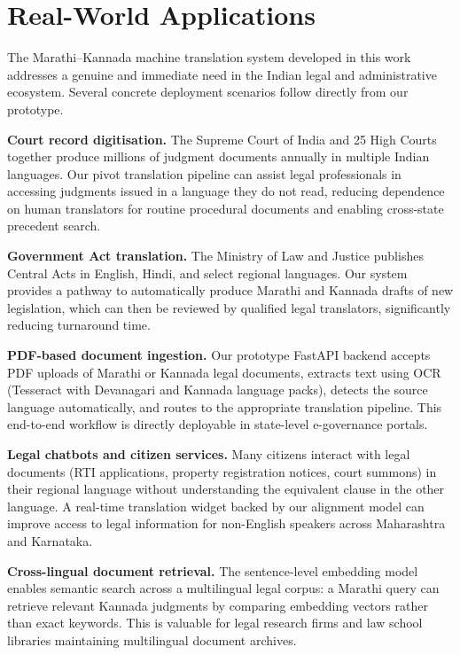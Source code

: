 \documentclass[conference,letterpaper]{IEEEtran}
\begin{document}
\vspace{0.5cm}

\section{Real-World Applications}

The Marathi--Kannada machine translation system developed in this work
addresses a genuine and immediate need in the Indian legal and
administrative ecosystem. Several concrete deployment scenarios follow
directly from our prototype.

\textbf{Court record digitisation.} The Supreme Court of India and 25 High
Courts together produce millions of judgment documents annually in multiple
Indian languages. Our pivot translation pipeline can assist legal
professionals in accessing judgments issued in a language they do not read,
reducing dependence on human translators for routine procedural documents
and enabling cross-state precedent search.

\textbf{Government Act translation.} The Ministry of Law and Justice
publishes Central Acts in English, Hindi, and select regional languages.
Our system provides a pathway to automatically produce Marathi and Kannada
drafts of new legislation, which can then be reviewed by qualified legal
translators, significantly reducing turnaround time.

\textbf{PDF-based document ingestion.} Our prototype FastAPI backend
accepts PDF uploads of Marathi or Kannada legal documents, extracts text
using OCR (Tesseract with Devanagari and Kannada language packs), detects
the source language automatically, and routes to the appropriate translation
pipeline. This end-to-end workflow is directly deployable in state-level
e-governance portals.

\textbf{Legal chatbots and citizen services.} Many citizens interact with
legal documents (RTI applications, property registration notices, court
summons) in their regional language without understanding the equivalent
clause in the other language. A real-time translation widget backed by our
alignment model can improve access to legal information for non-English
speakers across Maharashtra and Karnataka.

\textbf{Cross-lingual document retrieval.} The sentence-level embedding
model enables semantic search across a multilingual legal corpus:
a Marathi query can retrieve relevant Kannada judgments by comparing
embedding vectors rather than exact keywords. This is valuable for
legal research firms and law school libraries maintaining multilingual
document archives.
\end{document}
